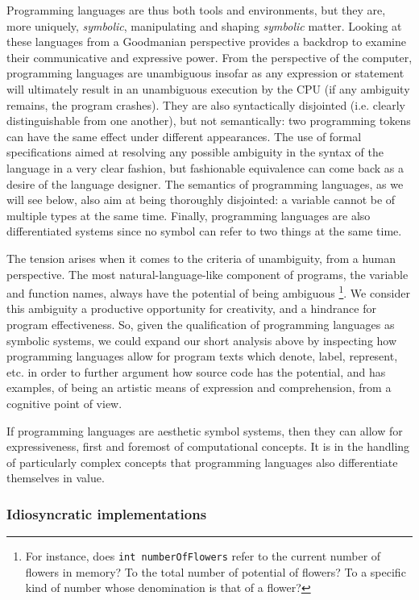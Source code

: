 Programming languages are thus both tools and environments, but they are, more uniquely, \emph{symbolic}, manipulating and shaping \emph{symbolic} matter. Looking at these languages from a Goodmanian perspective provides a backdrop to examine their communicative and expressive power. From the perspective of the computer, programming languages are unambiguous insofar as any expression or statement will ultimately result in an unambiguous execution by the CPU (if any ambiguity remains, the program crashes). They are also syntactically disjointed (i.e. clearly distinguishable from one another), but not semantically: two programming tokens can have the same effect under different appearances. The use of formal specifications aimed at resolving any possible ambiguity in the syntax of the language in a very clear fashion, but fashionable equivalence can come back as a desire of the language designer. The semantics of programming languages, as we will see below, also aim at being thoroughly disjointed: a variable cannot be of multiple types at the same time. Finally, programming languages are also differentiated systems since no symbol can refer to two things at the same time.

The tension arises when it comes to the criteria of unambiguity, from a human perspective. The most natural-language-like component of programs, the variable and function names, always have the potential of being ambiguous \footnote{For instance, does \lstinline{int numberOfFlowers} refer to the current number of flowers in memory? To the total number of potential of flowers? To a specific kind of number whose denomination is that of a flower?}. We consider this ambiguity a productive opportunity for creativity, and a hindrance for program effectiveness. So, given the qualification of programming languages as symbolic systems, we could expand our short analysis above by inspecting how programming languages allow for program texts which denote, label, represent, etc. in order to further argument how source code has the potential, and has examples, of being an artistic means of expression and comprehension, from a cognitive point of view.

If programming languages are aesthetic symbol systems, then they can allow for expressiveness, first and foremost of computational concepts. It is in the handling of particularly complex concepts that programming languages also differentiate themselves in value.

\subsubsection{Idiosyncratic implementations}
\label{subsubsec:idiosyncracies-implementations}

